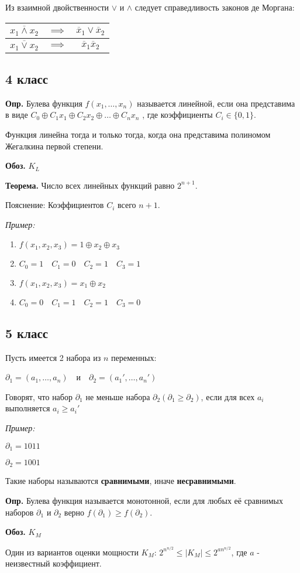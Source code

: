 \documentclass[10pt]{article}
\begin{document}
\par Из взаимной двойственности $\lor$ и $\land$ следует справедливость законов де Моргана:
\begin{tabular} {c c c}
    $\overline {x_1 \land x_2}$ & \(\implies\) & $\overline x_1 \lor \overline x_2$ \\
    \hline
    $\overline {x_1 \lor x_2}$ & \(\implies\) & $\overline x_1 \overline x_2$
\end{tabular}

\subsection*{4 класс}
\par\textbf{Опр.} Булева функция $f(x_1, \dots, x_n)$ называется линейной, если она представима в виде $C_0 \oplus C_1 x_1 \oplus C_2 x_2 \oplus \dots \oplus C_n x_n$ , где коэффициенты $C_i \in \{ 0, 1 \}$.
\par Функция линейна тогда и только тогда, когда она представима полиномом Жегалкина первой степени.
\par\textbf{Обоз.} $K_L$
\par\textbf{Теорема.} Число всех линейных функций равно $2^{n+1}$.
\par Пояснение: Коэффициентов $C_i$ всего $n + 1$.
\par\textit{Пример:}
\begin{enumerate}
\item $f(x_1, x_2, x_3) = 1 \oplus x_2 \oplus x_3$
\item[] $C_0 = 1 \quad C_1 = 0 \quad C_2 = 1 \quad C_3 = 1$
\item $f(x_1, x_2, x_3) = x_1 \oplus x_2$
\item[] $C_0 = 0 \quad C_1 = 1 \quad C_2 = 1 \quad C_3 = 0$
\end{enumerate}
\subsection*{5 класс}
\par Пусть имеется 2 набора из $n$ переменных:
\par $\partial_1 = (a_1, \dots, a_n) \quad$и$\quad \partial_2 = (a_1', \dots, a_n')$
\par Говорят, что набор $\partial_1$ не меньше набора $\partial_2 (\partial_1 \ge \partial_2)$, если для всех $a_i$ выполняется $a_i \ge a_i'$
\par\textit{Пример:}
\par $\partial_1 = 1011$
\par $\partial_2 = 1001$
\par Такие наборы называются \textbf{сравнимыми}, иначе \textbf{несравнимыми}.
\par\textbf{Опр.} Булева функция называется монотонной, если для любых её сравнимых наборов $\partial_1$ и $\partial_2$ верно $f(\partial_1) \ge f(\partial_2)$.
\par\textbf{Обоз.} $K_M$
\par Один из вариантов оценки мощности $K_M$: $2^{n^{n/2}} \le |K_M| \le 2^{an^{n/2}}$, где $a$ - неизвестный коэффициент.
\end{document}
